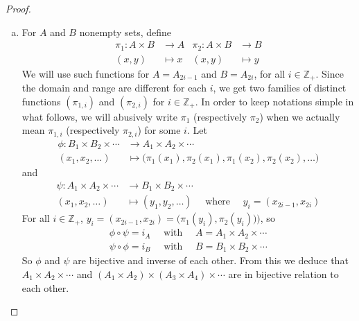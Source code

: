 \documentclass[11pt,a4paper,twoside]{article}
\theoremstyle{definition}
\begin{document}
\begin{proof}
\begin{enumerate}[(a)]
  \item For $A$ and $B$ nonempty sets, define
    \begin{align*}
      \pi_1 : A \times B &\to A &\pi_2 : A \times B &\to B \\
      (x, y) &\mapsto x &(x, y) &\mapsto y
    \end{align*}
    We will use such functions for $A = A_{2 i - 1}$ and $B = A_{2 i}$, for all $i \in \mathbb{Z}_+$. Since the domain and range are different for each $i$,
    we get two families of distinct functions $( \pi_{1, i} )$ and $( \pi_{2, i} )$ for $i \in \mathbb{Z}_+$. In order to keep notations simple in what follows,
    we will abusively write $\pi_1$ (respectively $\pi_2$) when we actually mean $\pi_{1, i}$ (respectively $\pi_{2, i}$) for some $i$.
    Let
    \begin{align*}
      \phi : B_1 \times B_2 \times \dotsb &\to A_1 \times A_2 \times \dotsb \\
      ( x_1, x_2, \dotsc ) &\mapsto \big( \pi_1 (x_1), \pi_2 (x_1), \pi_1 (x_2), \pi_2 (x_2), \dotsc \big)
    \end{align*}
    and
    \begin{align*}
      \psi : A_1 \times A_2 \times \dotsb &\to B_1 \times B_2 \times \dotsb \\
      (x_1, x_2, \dotsc) &\mapsto (y_1, y_2, \dotsc) \quad\text{ where }\quad y_i = ( x_{2 i - 1}, x_{2 i} )
    \end{align*}
    For all $i \in \mathbb{Z}_+$, $y_i = ( x_{2 i - 1}, x_{2 i} ) = \big( \pi_1 (y_i), \pi_2 (y_i) \big))$, so
    \begin{align*}
      \phi \circ \psi = i_A \quad\text{ with }\quad A = A_1 \times A_2 \times \dotsb \\
      \psi \circ \phi = i_B \quad\text{ with }\quad B = B_1 \times B_2 \times \dotsb
    \end{align*}
    So $\phi$ and $\psi$ are bijective and inverse of each other. From this we deduce that $A_1 \times A_2 \times \dotsb$ and
    $( A_1 \times A_2 ) \times ( A_3 \times A_4 ) \times \dotsb$ are in bijective relation to each other.

  \end{enumerate}

\end{proof}
\end{document}
